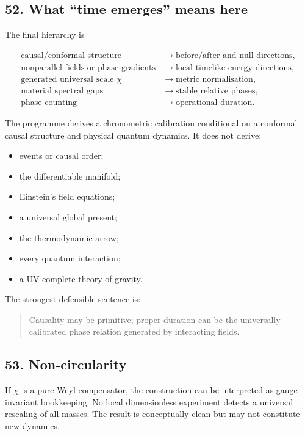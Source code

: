 \documentclass[
]{article}
\providecommand{\tightlist}{%
  \setlength{\itemsep}{0pt}\setlength{\parskip}{0pt}}
\begin{document}
\subsection{52. What ``time emerges'' means
here}\label{what-time-emerges-means-here}

The final hierarchy is

\[
\boxed{
\begin{aligned}
\text{causal/conformal structure}
&\longrightarrow\text{before/after and null directions},\\
\text{nonparallel fields or phase gradients}
&\longrightarrow\text{local timelike energy directions},\\
\text{generated universal scale }\chi
&\longrightarrow\text{metric normalisation},\\
\text{material spectral gaps}
&\longrightarrow\text{stable relative phases},\\
\text{phase counting}
&\longrightarrow\text{operational duration}.
\end{aligned}}
\]

The programme derives a chronometric calibration conditional on a
conformal causal structure and physical quantum dynamics. It does not
derive:

\begin{itemize}
\tightlist
\item
  events or causal order;
\item
  the differentiable manifold;
\item
  Einstein's field equations;
\item
  a universal global present;
\item
  the thermodynamic arrow;
\item
  every quantum interaction;
\item
  a UV-complete theory of gravity.
\end{itemize}

The strongest defensible sentence is:

\begin{quote}
Causality may be primitive; proper duration can be the universally
calibrated phase relation generated by interacting fields.
\end{quote}

\subsection{53. Non-circularity}\label{non-circularity}

If \(\chi\) is a pure Weyl compensator, the construction can be
interpreted as gauge-invariant bookkeeping. No local dimensionless
experiment detects a universal rescaling of all masses. The result is
conceptually clean but may not constitute new dynamics.
\end{document}
